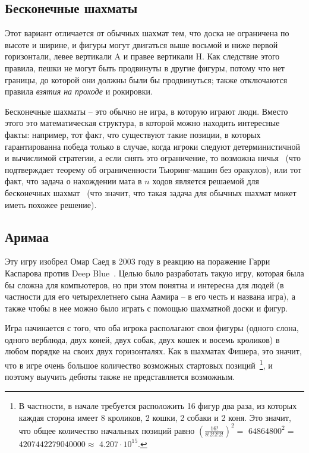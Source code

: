 \documentclass{article}
\begin{document}
\subsection{Бесконечные шахматы}

Этот вариант отличается от обычных шахмат тем, 
что доска не ограничена по высоте и ширине,
и фигуры могут двигаться выше восьмой и ниже первой горизонтали,
левее вертикали A и правее вертикали H.
Как следствие этого правила, пешки не могут быть продвинуты в другие фигуры, потому что нет границы, до которой они должны были бы продвинуться;
также отключаются правила \emph{взятия на проходе} и рокировки.

Бесконечные шахматы -- это обычно не игра, в которую играют люди.
Вместо этого это математическая структура, в которой можно находить интересные факты:
например, тот факт, что существуют такие позиции,
в которых гарантированна победа только в случае, когда игроки следуют
детерминистичной и вычислимой стратегии, а если снять это ограничение, то возможна ничья~\cite{transfinite-game-values} 
(что подтверждает теорему об ограниченности Тьюринг-машин без оракулов),
или тот факт, что задача о нахождении мата в $n$ ходов 
является решаемой для бесконечных шахмат~\cite{infinite-mate-in-n}
(что значит, что такая задача для обычных шахмат может иметь похожее решение).

\subsection{Аримаа}

Эту игру изобрел Омар Саед в 2003 году в реакцию на поражение Гарри Каспарова против Deep Blue~\cite{arimaa}.
Целью было разработать такую игру, которая была бы сложна для компьютеров,
но при этом понятна и интересна для людей (в частности для его четырехлетнего сына Аамира -- в его честь и названа игра),
а также чтобы в нее можно было играть с помощью шахматной доски и фигур.

Игра начинается с того, что оба игрока располагают свои фигуры (одного слона, одного верблюда, двух коней, двух собак, двух кошек и восемь кроликов)
в любом порядке на своих двух горизонталях.
Как в шахматах Фишера,
это значит,
что в игре очень большое количество возможных стартовых позиций~\footnote{
    В частности, в начале требуется расположить 16 фигур два раза,
    из которых каждая сторона имеет 8 кроликов, 2 кошки, 2 собаки и 2 коня.
    Это значит, что общее количество начальных позиций равно $(\frac{16!}{8!2!2!2!})^2 =$
    $64864800^2 = $ $4207442279040000 \approx $ $ 4.207 \cdot 10^{15}$.
},
и поэтому выучить дебюты также не представляется возможным.
\end{document}
